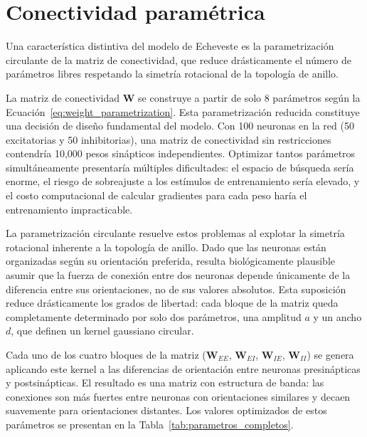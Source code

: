 
\section{Conectividad paramétrica}
\label{sec:impl_conectividad}

Una característica distintiva del modelo de Echeveste es la parametrización circulante de la matriz de conectividad, que reduce drásticamente el número de parámetros libres respetando la simetría rotacional de la topología de anillo.

La matriz de conectividad $\mathbf{W}$ se construye a partir de solo 8 parámetros según la Ecuación~\ref{eq:weight_parametrization}. Esta parametrización reducida constituye una decisión de diseño fundamental del modelo. Con 100 neuronas en la red (50 excitatorias y 50 inhibitorias), una matriz de conectividad sin restricciones contendría 10,000 pesos sinápticos independientes. Optimizar tantos parámetros simultáneamente presentaría múltiples dificultades: el espacio de búsqueda sería enorme, el riesgo de sobreajuste a los estímulos de entrenamiento sería elevado, y el costo computacional de calcular gradientes para cada peso haría el entrenamiento impracticable.

La parametrización circulante resuelve estos problemas al explotar la simetría rotacional inherente a la topología de anillo. Dado que las neuronas están organizadas según su orientación preferida, resulta biológicamente plausible asumir que la fuerza de conexión entre dos neuronas depende únicamente de la diferencia entre sus orientaciones, no de sus valores absolutos. Esta suposición reduce drásticamente los grados de libertad: cada bloque de la matriz queda completamente determinado por solo dos parámetros, una amplitud $a$ y un ancho $d$, que definen un kernel gaussiano circular.

Cada uno de los cuatro bloques de la matriz ($\mathbf{W}_{EE}$, $\mathbf{W}_{EI}$, $\mathbf{W}_{IE}$, $\mathbf{W}_{II}$) se genera aplicando este kernel a las diferencias de orientación entre neuronas presinápticas y postsinápticas. El resultado es una matriz con estructura de banda: las conexiones son más fuertes entre neuronas con orientaciones similares y decaen suavemente para orientaciones distantes. Los valores optimizados de estos parámetros se presentan en la Tabla~\ref{tab:parametros_completos}.


